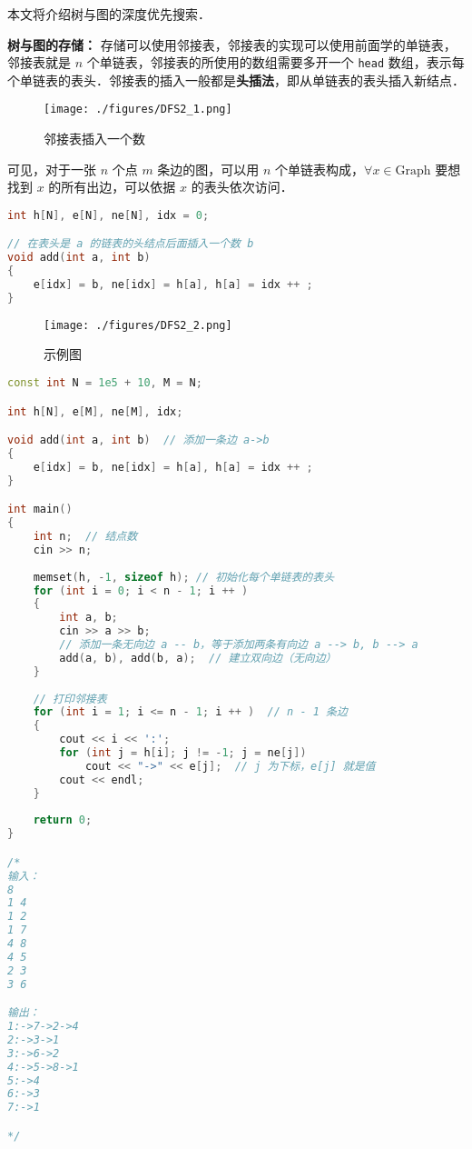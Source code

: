 
本文将介绍树与图的深度优先搜索．

\textbf{树与图的存储：}
存储可以使用邻接表，邻接表的实现可以使用前面学的单链表，邻接表就是 $n$ 个单链表，邻接表的所使用的数组需要多开一个 \verb|head| 数组，表示每个单链表的表头．邻接表的插入一般都是\textbf{头插法}，即从单链表的表头插入新结点．

\begin{figure}[ht]
\centering
\texttt{[image: ./figures/DFS2\_1.png]}
\caption{邻接表插入一个数} \label{DFS2_fig1}
\end{figure}

可见，对于一张 $n$ 个点 $m$ 条边的图，可以用 $n$ 个单链表构成，$\forall x\in \text{Graph}$ 要想找到 $x$ 的所有出边，可以依据 $x$ 的表头依次访问．

\begin{lstlisting}[language=cpp]
int h[N], e[N], ne[N], idx = 0;

// 在表头是 a 的链表的头结点后面插入一个数 b
void add(int a, int b)
{
    e[idx] = b, ne[idx] = h[a], h[a] = idx ++ ;
}
\end{lstlisting}

\begin{figure}[ht]
\centering
\texttt{[image: ./figures/DFS2\_2.png]}
\caption{示例图} \label{DFS2_fig2}
\end{figure}

\begin{lstlisting}[language=cpp]
const int N = 1e5 + 10, M = N;

int h[N], e[M], ne[M], idx;

void add(int a, int b)  // 添加一条边 a->b
{
    e[idx] = b, ne[idx] = h[a], h[a] = idx ++ ;
}

int main()
{
    int n;  // 结点数
    cin >> n;
    
    memset(h, -1, sizeof h); // 初始化每个单链表的表头
    for (int i = 0; i < n - 1; i ++ )
    {
        int a, b;
        cin >> a >> b;
        // 添加一条无向边 a -- b，等于添加两条有向边 a --> b, b --> a
        add(a, b), add(b, a);  // 建立双向边（无向边）
    }
    
    // 打印邻接表
    for (int i = 1; i <= n - 1; i ++ )  // n - 1 条边
    {
        cout << i << ':';
        for (int j = h[i]; j != -1; j = ne[j])
            cout << "->" << e[j];  // j 为下标，e[j] 就是值
        cout << endl;
    }
    
    return 0;
}

/*
输入：
8
1 4
1 2
1 7
4 8
4 5
2 3
3 6

输出：
1:->7->2->4
2:->3->1
3:->6->2
4:->5->8->1
5:->4
6:->3
7:->1

*/
\end{lstlisting}


